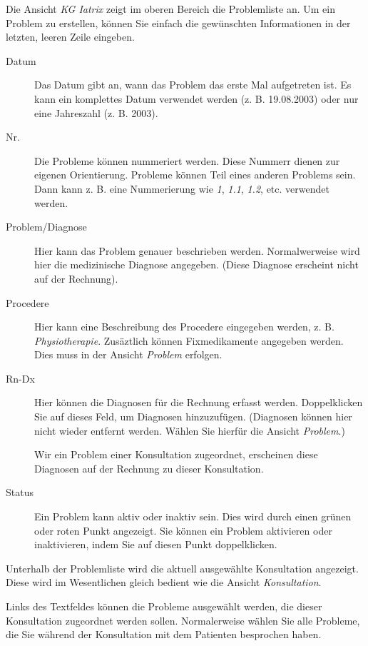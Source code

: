 Die Ansicht \textit{KG Iatrix} zeigt im oberen Bereich die Problemliste an.
Um ein Problem zu erstellen, können Sie einfach die gewünschten Informationen
in der letzten, leeren Zeile eingeben.

\begin{description}

\item[Datum]
Das Datum gibt an, wann das Problem das erste Mal aufgetreten ist. Es kann ein
komplettes Datum verwendet werden (z. B. 19.08.2003) oder nur eine Jahreszahl
(z. B. 2003).

\item[Nr.]
Die Probleme können nummeriert werden. Diese Nummerr
dienen zur eigenen Orientierung. Probleme können Teil eines anderen Problems
sein. Dann kann z. B. eine Nummerierung wie \textit{1}, \textit{1.1}, \textit{1.2}, etc.
verwendet werden.

\item[Problem/Diagnose]
Hier kann das Problem genauer beschrieben werden. Normalwerweise wird hier
die medizinische Diagnose angegeben. (Diese Diagnose erscheint nicht auf der
Rechnung).

\item[Procedere]
Hier kann eine Beschreibung des Procedere eingegeben werden, z. B. \textit{Physiotherapie}.
Zusäztlich können Fixmedikamente angegeben werden. Dies muss in der Ansicht \textit{Problem}
erfolgen.

\item[Rn-Dx]
Hier können die Diagnosen für die Rechnung erfasst werden. Doppelklicken Sie
auf dieses Feld, um Diagnosen hinzuzufügen. (Diagnosen können hier nicht wieder
entfernt werden. Wählen Sie hierfür die Ansicht \textit{Problem}.)

Wir ein Problem einer Konsultation zugeordnet, erscheinen diese Diagnosen
auf der Rechnung zu dieser Konsultation.

\item[Status]
Ein Problem kann aktiv oder inaktiv sein. Dies wird durch einen grünen oder
roten Punkt angezeigt. Sie können ein Problem aktivieren oder inaktivieren,
indem Sie auf diesen Punkt doppelklicken.

\end{description}

Unterhalb der Problemliste wird die aktuell ausgewählte Konsultation angezeigt.
Diese wird im Wesentlichen gleich bedient wie die Ansicht \textit{Konsultation}.

Links des Textfeldes können die Probleme ausgewählt werden, die dieser Konsultation
zugeordnet werden sollen. Normalerweise wählen Sie alle Probleme, die Sie
während der Konsultation mit dem Patienten besprochen haben.

